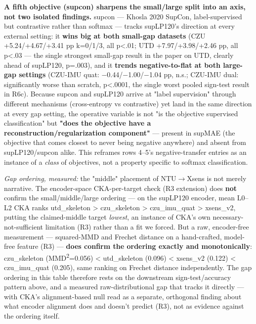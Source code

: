 \textbf{A fifth objective (supcon) sharpens the small/large split into an axis, not two isolated findings.} supcon --- Khosla 2020 SupCon, label-supervised but contrastive rather than softmax --- tracks supLP120's direction at every external setting: it \textbf{wins big at both small-gap datasets} (CZU +5.24/+4.67/+3.41 pp k=0/1/3, all p<.01; UTD +7.97/+3.98/+2.46 pp, all p<.03 --- the single strongest small-gap result in the paper on UTD, clearly ahead of supLP120, p=.003), and it \textbf{trends negative-to-flat at both large-gap settings} (CZU-IMU quat: $-$0.44/$-$1.00/$-$1.04 pp, n.s.; CZU-IMU dual: significantly worse than scratch, p<.0001, the single worst pooled sign-test result in R6c). Because supcon and supLP120 arrive at "label supervision" through different mechanisms (cross-entropy vs contrastive) yet land in the same direction at every gap setting, the operative variable is not "is the objective supervised classification" but \textbf{"does the objective have a reconstruction/regularization component"} --- present in supMAE (the objective that comes closest to never being negative anywhere) and absent from supLP120/supcon alike. This reframes rows 4--5's negative-transfer entries as an instance of a \textit{class} of objectives, not a property specific to softmax classification.

\textit{Gap ordering, measured:} the "middle" placement of NTU$\rightarrow$Xsens is not merely narrative. The encoder-space CKA-per-target check (R3 extension) does \textbf{not} confirm the small/middle/large ordering --- on the supLP120 encoder, mean L0--L2 CKA ranks utd\_skeleton > czu\_skeleton > czu\_imu\_quat > xsens\_v2, putting the claimed-middle target \textit{lowest}, an instance of CKA's own necessary-not-sufficient limitation (R3) rather than a fit we forced. But a raw, encoder-free measurement --- squared-MMD and Frechet distance on a hand-crafted, model-free feature (R3) --- \textbf{does confirm the ordering exactly and monotonically}: czu\_skeleton (MMD\textsuperscript{2}=0.056) < utd\_skeleton (0.096) < xsens\_v2 (0.122) < czu\_imu\_quat (0.205), same ranking on Frechet distance independently. The gap ordering in this table therefore rests on the downstream sign-test/accuracy pattern above, and a measured raw-distributional gap that tracks it directly --- with CKA's alignment-based null read as a separate, orthogonal finding about what encoder alignment does and doesn't predict (R3), not as evidence against the ordering itself.

